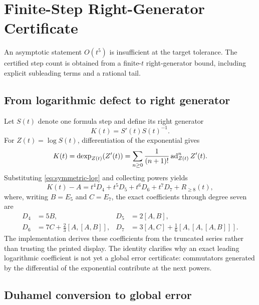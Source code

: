\section{Finite-Step Right-Generator Certificate}
\label{sec:finite-step}

An asymptotic statement $O(t^5)$ is insufficient at the target tolerance.
The certified step count is obtained from a finite-$t$ right-generator bound,
including explicit subleading terms and a rational tail.

\subsection{From logarithmic defect to right generator}

Let $S(t)$ denote one formula step and define its right generator
\begin{equation}
  K(t)=S'(t)S(t)^{-1}.
  \label{eq:right-generator}
\end{equation}
For $Z(t)=\log S(t)$, differentiation of the exponential gives
\begin{equation}
  K(t)=\operatorname{dexp}_{Z(t)}(Z'(t))
      =\sum_{n\geq0}\frac{1}{(n+1)!}\operatorname{ad}_{Z(t)}^n Z'(t).
  \label{eq:dexp}
\end{equation}
Substituting \cref{eq:symmetric-log} and collecting powers yields
\begin{equation}
  K(t)-A=t^4D_4+t^5D_5+t^6D_6+t^7D_7+R_{\geq8}(t),
  \label{eq:right-ledger}
\end{equation}
where, writing $B=E_5$ and $C=E_7$, the exact coefficients through degree
seven are
\begin{align}
 D_4&=5B, &
 D_5&=2[A,B],\\
 D_6&=7C+\tfrac23[A,[A,B]], &
 D_7&=3[A,C]+\tfrac16[A,[A,[A,B]]].
\end{align}
The implementation derives these coefficients from the truncated series
rather than trusting the printed display.  The identity clarifies why an
exact leading logarithmic coefficient is not yet a global error certificate:
commutators generated by the differential of the exponential contribute at
the next powers.

\subsection{Duhamel conversion to global error}

